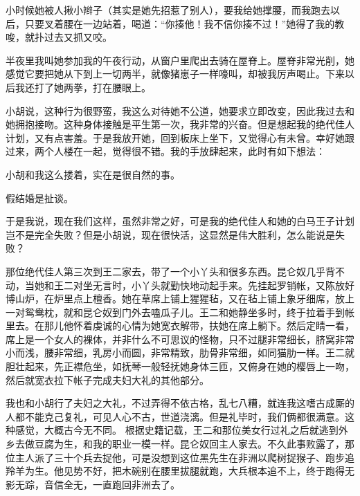 小时候她被人揪小辫子（其实是她先招惹了别人），要我给她撑腰，而我跑去以后，只要叉着腰在一边站着，喝道：“你揍他！我不信你揍不过！”她得了我的教唆，就扑过去又抓又咬。 

半夜里我叫她参加我的午夜行动，从窗户里爬出去骑在屋脊上。屋脊非常光削，她感觉它要把她从下到上一切两半，就像猪崽子一样嚎叫，却被我厉声喝止。下来以后我还打了她两拳，打在腰眼上。 

小胡说，这种行为很野蛮，我这么对待她不公道，她要求立即改变，因此我过去和她拥抱接吻。这种身体接触是平生第一次，我非常的兴奋。但是想起我的绝代佳人计划，又有点害羞。于是我放开她，回到板床上坐下，又觉得心有未曾。幸好她跟过来，两个人楼在一起，觉得很不错。我的手放肆起来，此时有如下想法： 

小胡和我这么搂着，实在是很自然的事。 

假结婚是扯谈。 

于是我说，现在我们这样，虽然非常之好，可是我的绝代佳人和她的白马王子计划岂不是完全失败？但是小胡说，现在很快活，这显然是伟大胜利，怎么能说是失败？ 

那位绝代佳人第三次到王二家去，带了一个小丫头和很多东西。昆仑奴几乎背不动，当她和王二对坐无言时，小丫头就勤快地动起手来。先挂起罗销帐，又陈放好博山炉，在炉里点上檀香。她在草席上铺上猩猩毡，又在毡上铺上象牙细席，放上一对鸳鸯枕，就和昆仑奴到门外去嗑瓜子儿。王二和她静坐多时，终于拉着手到帐里去。在那儿他怀着虔诚的心情为她宽衣解带，扶她在席上躺下。然后定睛一看，席上是一个女人的裸体，并非什么不可思议的怪物，只不过腿非常细长，脐窝非常小而浅，腰非常细，乳房小而圆，非常精致，肋骨非常细，如同猫肋一样。王二就胆壮起来，先正襟危坐，如抚琴一般轻抚她身体三匝，又俯身在她的樱唇上一吻，然后就宽衣拉下帐子完成夫妇大礼的其他部分。 

我也和小胡行了夫妇之大礼，不过弄得不依古格，乱七八糟，就连我这嗜古成厮的人都不能克己复礼，可见人心不古，世道浇漓。但是礼毕时，我们俩都很满意。这种感觉，大概古今无不同。 根据史籍记载，王二和那位美女行过礼之后就逃到外乡去做豆腐为生，和我的职业一模一样。昆仑奴回主人家去。不久此事败露了，那位主人派了三十个兵去捉他，可是没想到这位黑先生在非洲以爬树捉猴子、跑步追羚羊为生。他见势不好，把木碗别在腰里拔腿就跑，大兵根本追不上，终于跑得无影无踪，音信全无，一直跑回非洲去了。
